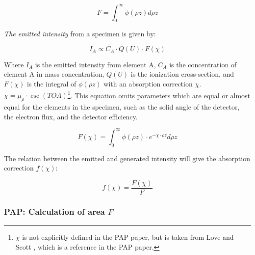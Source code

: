 \begin{equation}
    \label{eq:theory:quantitative:pap:general_principle:F}
    F = \int_0^\infty \phi(\rho z) d\rho z
\end{equation}


\emph{The emitted intensity} from a specimen is given by:

\begin{equation}
    \label{eq:theory:quantitative:pap:general_principle:I_A}
    I_A \propto C_A \cdot Q(U) \cdot F(\chi)
\end{equation}

Where $I_A$ is the emitted intensity from element A, $C_A$ is the concentration of element A in mass concentration, $Q(U)$ is the ionization cross-section, and $F(\chi)$ is the integral of $\phi(\rho z)$ with an absorption correction $\chi$.
$ \chi = \mu_\rho \cdot \csc(TOA)$\footnote{$\chi$ is not explicitly defined in the PAP paper, but is taken from Love and Scott \cite[Eq. (1)]{love_scott_1990}, which is a reference in the PAP paper.}.
This equation omits parameters which are equal or almost equal for the elements in the specimen, such as the solid angle of the detector, the electron flux, and the detector efficiency.


\begin{equation}
    \label{eq:theory:quantitative:pap:general_principle:f_of_chi}
    F(\chi) = \int_0^\infty \phi(\rho z) \cdot e^{-\chi \cdot \rho z} d\rho z
\end{equation}


The relation between the emitted and generated intensity will give the absorption correction $f(\chi)$:

\begin{equation}
    \label{eq:theory:quantitative:pap:general_principle:f_absorption_correction}
    f(\chi) = \frac{F(\chi)}{F}
\end{equation}















\subsubsection{PAP: Calculation of area $F$}

